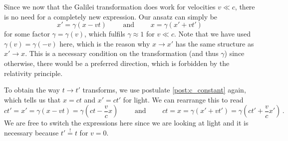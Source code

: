Since we now that the Galilei transformation does work for velocities $v \ll c$, there is no need for a completely new expression. Our ansatz can simply be
\begin{equation}\label{eq:lorentz_spatial_ansatz}
	x' = \gamma (x - vt)
	\qquad \text{ and } \qquad
	x = \gamma (x' + vt')
\end{equation}
for some factor $\gamma = \gamma(v)$, which fulfils $\gamma \approx 1$ for $v \ll c$. Note that we have used $\gamma(v) = \gamma(-v)$ here, which is the reason why $x \rightarrow x'$ has the same structure as $x' \rightarrow x$. This is a necessary condition on the transformation (and thus $\gamma$) since otherwise, there would be a preferred direction, which is forbidden by the relativity principle.

To obtain the way $t \rightarrow t'$ transforms, we use postulate \ref{post:c_constant} again, which tells us that $x = ct$ and $x' = ct'$ for light. We can rearrange this to read
\begin{equation}\label{eq:lorentz_time_ansatz}
	ct' = x' = \gamma (x - vt) = \gamma (ct - \frac{v}{c} x)
	\qquad \text{ and } \qquad
	ct = x = \gamma (x' + vt') = \gamma (ct' + \frac{v}{c} x') \, .
\end{equation}
We are free to switch the expressions here since we are looking at light and it is necessary because $t' \overset{!}{=} t$ for $v = 0$.

